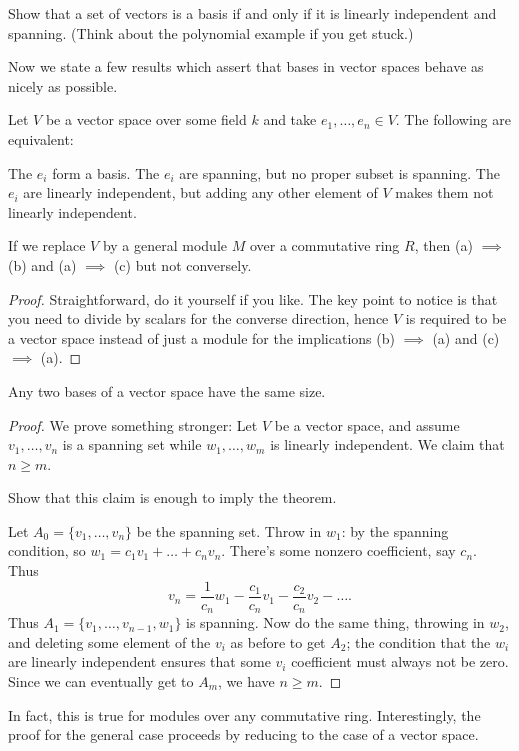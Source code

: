 \begin{ques}
	Show that a set of vectors is a basis if and only if
	it is linearly independent and spanning.
	(Think about the polynomial example if you get stuck.)
\end{ques}

Now we state a few results which assert
that bases in vector spaces behave as nicely as possible.
\begin{theorem}
	\label{thm:vector_best}
	Let $V$ be a vector space over some field $k$
	and take $e_1, \dots, e_n \in V$. The following are equivalent:
	\begin{enumerate}[(a)]
		\ii The $e_i$ form a basis.
		\ii The $e_i$ are spanning, but no proper subset is spanning.
		\ii The $e_i$ are linearly independent, but adding any other
		element of $V$ makes them not linearly independent.
	\end{enumerate}
\end{theorem}
\begin{remark}
	If we replace $V$ by a general module $M$ over a commutative ring $R$,
	then (a) $\implies$ (b) and (a) $\implies$ (c) but not conversely.
\end{remark}
\begin{proof}
	Straightforward, do it yourself if you like.
	The key point to notice is that you need to divide by scalars for the converse direction,
	hence $V$ is required to be a vector space instead of just a module
	for the implications (b) $\implies$ (a) and (c) $\implies$ (a).
\end{proof}

\begin{theorem}
	Any two bases of a vector space have the same size.
\end{theorem}
\begin{proof}
	We prove something stronger:
	Let $V$ be a vector space, and assume $v_1, \dots, v_n$ is a spanning set
	while $w_1, \dots, w_m$ is linearly independent. We claim that $n \ge m$.
	\begin{ques}
		Show that this claim is enough to imply the theorem.
	\end{ques}

	Let $A_0 = \{v_1, \dots, v_n\}$ be the spanning set.
	Throw in $w_1$: by the spanning condition, so $w_1 = c_1v_1 + \dots + c_nv_n$.
	There's some nonzero coefficient, say $c_n$.
	Thus \[ v_n = \frac{1}{c_n} w_1 - \frac{c_1}{c_n}v_1 - \frac{c_2}{c_n}v_2 - \dots. \]
	Thus $A_1 = \{v_1, \dots, v_{n-1}, w_1\}$ is spanning.
	Now do the same thing, throwing in $w_2$, and deleting some element of the $v_i$ as before to get $A_2$;
	the condition that the $w_i$ are linearly independent ensures that some $v_i$ coefficient
	must always not be zero.
	Since we can eventually get to $A_m$, we have $n \ge m$.
\end{proof}
\begin{remark}
	In fact, this is true for modules over any commutative ring.
	Interestingly, the proof for the general case proceeds by reducing
	to the case of a vector space.
\end{remark}


